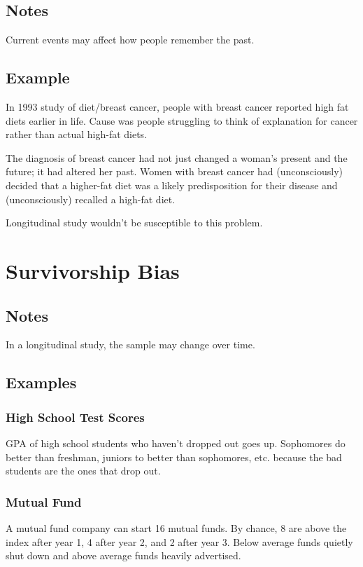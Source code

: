 \documentclass[landscape]{exam}
\begin{document}
  \subsection{Notes}

  Current events may affect how people remember the past.  

  \subsection{Example}

  In 1993 study of diet/breast cancer, people with breast cancer reported high
  fat diets earlier in life.  Cause was people struggling to think of
  explanation for cancer rather than actual high-fat diets.

  \begin{em}
    The diagnosis of breast cancer had not just changed a woman’s present and the
    future; it had altered her past. Women with breast cancer had (unconsciously)
    decided that a higher-fat diet was a likely predisposition for their disease
    and (unconsciously) recalled a high-fat diet.
  \end{em}

  Longitudinal study wouldn't be susceptible to this problem.

  \section{Survivorship Bias}
  \subsection{Notes}
  In a longitudinal study, the sample may change over time.

  \subsection{Examples}
  \subsubsection{High School Test Scores}
  GPA of high school students who haven't dropped out goes up.  Sophomores do
  better than freshman, juniors to better than sophomores, etc. because the bad
  students are the ones that drop out.

  \subsubsection{Mutual Fund}
  A mutual fund company can start 16 mutual funds.  By chance, 8 are above
  the index after year 1, 4 after year 2, and 2 after year 3.  Below average
  funds quietly shut down and above average funds heavily advertised.
\end{document}
